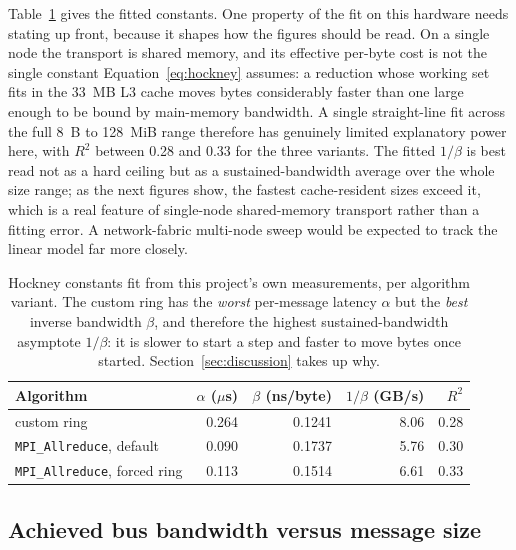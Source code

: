 Table~\ref{tab:fits} gives the fitted constants. One property of the fit on this hardware needs stating up front, because it shapes how the figures should be read. On a single node the transport is shared memory, and its effective per-byte cost is not the single constant Equation~\ref{eq:hockney} assumes: a reduction whose working set fits in the 33~MB L3 cache moves bytes considerably faster than one large enough to be bound by main-memory bandwidth. A single straight-line fit across the full 8~B to 128~MiB range therefore has genuinely limited explanatory power here, with $R^2$ between 0.28 and 0.33 for the three variants. The fitted $1/\beta$ is best read not as a hard ceiling but as a sustained-bandwidth average over the whole size range; as the next figures show, the fastest cache-resident sizes exceed it, which is a real feature of single-node shared-memory transport rather than a fitting error. A network-fabric multi-node sweep would be expected to track the linear model far more closely.

\begin{table}[htbp]
\centering
\begin{tabular}{lrrrr}
\toprule
Algorithm & $\alpha$ ($\mu$s) & $\beta$ (ns/byte) & $1/\beta$ (GB/s) & $R^2$ \\
\midrule
custom ring              & 0.264 & 0.1241 & 8.06 & 0.28 \\
\texttt{MPI\_Allreduce}, default     & 0.090 & 0.1737 & 5.76 & 0.30 \\
\texttt{MPI\_Allreduce}, forced ring & 0.113 & 0.1514 & 6.61 & 0.33 \\
\bottomrule
\end{tabular}
\caption{Hockney constants fit from this project's own measurements, per algorithm variant. The custom ring has the \emph{worst} per-message latency $\alpha$ but the \emph{best} inverse bandwidth $\beta$, and therefore the highest sustained-bandwidth asymptote $1/\beta$: it is slower to start a step and faster to move bytes once started. Section~\ref{sec:discussion} takes up why.}
\label{tab:fits}
\end{table}

\subsection{Achieved bus bandwidth versus message size}

